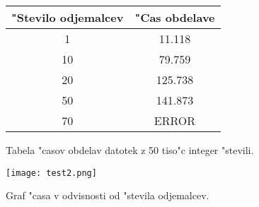 \begin{figure}
  \centering
  \begin{tabular}{ | c | c | }
    \hline
    "Stevilo odjemalcev & "Cas obdelave\\ \hline
	1 & 11.118 \\ \hline
    10 & 79.759 \\ \hline
    20 & 125.738 \\ \hline
    50 & 141.873 \\ \hline
    70 & ERROR \\ \hline
  \end{tabular}
  \caption{Tabela "casov obdelav datotek z 50 tiso"c integer "stevili.}
  \label{8_table2}
  \centering
\end{figure}

\begin{figure}
  \centering
    \texttt{[image: test2.png]}
  \caption{Graf "casa v odvisnosti od "stevila odjemalcev.}
  \label{8_test2}  
\end{figure}